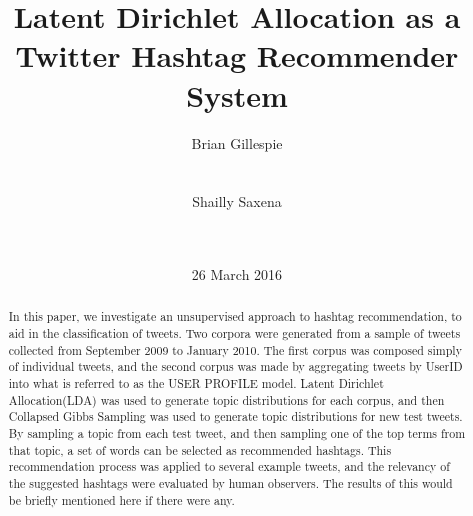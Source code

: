 \documentclass{acm_proc_article-sp}
\begin{document}
\title{Latent Dirichlet Allocation as a Twitter Hashtag Recommender System
	}



\author{
\alignauthor
Brian Gillespie\\
       \\
       \\
\alignauthor
Shailly Saxena\\
       \\
       \\
}

\date{26 March 2016}



\maketitle
\begin{abstract}
\hspace*{5mm}In this paper, we investigate an unsupervised approach to hashtag recommendation, to aid in the classification of tweets. Two corpora were generated from a sample of tweets collected from September 2009 to January 2010. The first corpus was composed simply of individual tweets, and the second corpus was made by aggregating tweets by UserID into what is referred to as the USER PROFILE model. Latent Dirichlet Allocation(LDA) was used to generate topic distributions for each corpus, and then Collapsed Gibbs Sampling was used to generate topic distributions for new test tweets. By sampling a topic from each test tweet, and then sampling one of the top terms from that topic, a set of words can be selected as recommended hashtags. This recommendation process was applied to several example tweets, and the relevancy of the suggested hashtags were evaluated by human observers. The results of this would be briefly mentioned here if there were any.
\end{abstract}

\end{document}
